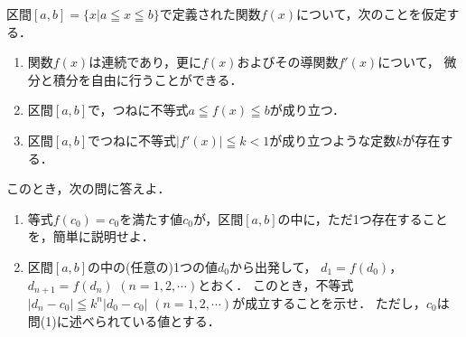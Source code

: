 \documentclass[../../main.tex]{subfiles}
\begin{document}
区間$[a,b]=\{ x|a \leqq x \leqq b \}$で定義された関数$f(x)$について，次のことを仮定する．
\begin{enumerate}
  \item 関数$f(x)$は連続であり，更に$f(x)$およびその導関数$f'(x)$について，
    微分と積分を自由に行うことができる．
  \item 区間$[a,b]$で，つねに不等式$a \leqq f(x) \leqq b$が成り立つ．
  \item 区間$[a,b]$でつねに不等式$|f'(x)|\leqq k<1$が成り立つような定数$k$が存在する．
\end{enumerate}
このとき，次の問に答えよ．
\begin{enumerate}
  \item 等式$f(c_0)=c_0$を満たす値$c_0$が，区間$[a,b]$の中に，ただ1つ存在することを，簡単に説明せよ．
  \item 区間$[a,b]$の中の(任意の)1つの値$d_0$から出発して，
    $d_1=f(d_0)$，$d_{n+1}=f(d_n)$ $(n=1,2,\cdots)$とおく．
    このとき，不等式$|d_n-c_0| \leqq k^n|d_0-c_0|$ $(n=1,2,\cdots)$が成立することを示せ．
    ただし，$c_0$は問(1)に述べられている値とする．
\end{enumerate}
\end{document}
